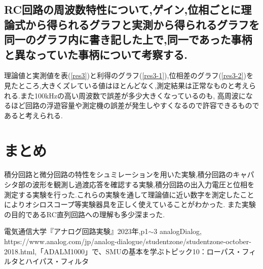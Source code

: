 \documentclass[a4j,10pt,dvipdfmx]{jarticle}
\begin{document}
\subsection{RC回路の周波数特性について,ゲイン,位相ごとに理論式から得られるグラフと実測から得られるグラフを同一のグラフ内に書き記した上で,同一であった事柄と異なっていた事柄について考察する.}
理論値と実測値を表(\ref{res3})と利得のグラフ(\ref{res3-1}),位相差のグラフ(\ref{res3-2})を見たところ,大きくズレている値はほとんどなく,測定結果は正常なものと考えられる.また100kHzの高い周波数で誤差が多少大きくなっているのも,
高周波になるほど回路の浮遊容量や測定機の誤差が発生しやすくなるので許容できるものであると考えられる.
\section{まとめ}
積分回路と微分回路の特性をシュミレーションを用いた実験,積分回路のキャパシタ部の波形を観測し過渡応答を確認する実験,積分回路の出入力電圧と位相を測定する実験を行った.これらの実験を通して理論値に近い数字を測定したことによりオシロスコープ等実験器具を正しく使えていることがわかった.
また実験の目的であるRC直列回路への理解も多少深まった.

\begin{thebibliography}{9}
   電気通信大学『アナログ回路実験』2023年,p1$\sim$3
  analogDialog, https://www.analog.com/jp/analog-dialogue/studentzone/studentzone-october-2018.html,「ADALM1000」で、SMUの基本を学ぶトピック10：ローパス・フィルタとハイパス・フィルタ
\end{thebibliography}
\end{document}
